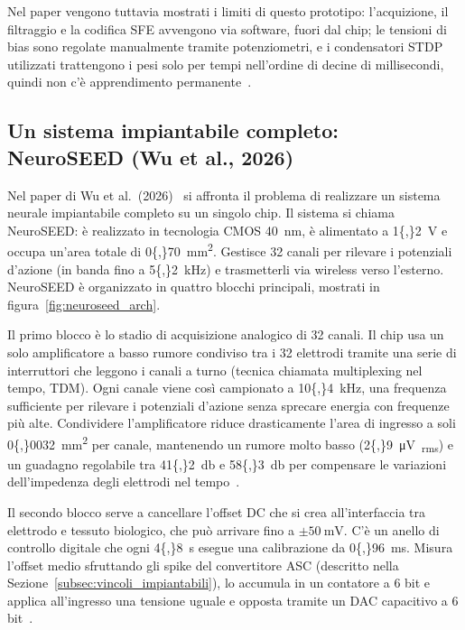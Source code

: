 Nel paper vengono tuttavia mostrati i limiti di questo prototipo: l'acquizione, il filtraggio e la codifica SFE avvengono via software, fuori dal chip; le tensioni di bias sono regolate manualmente tramite potenziometri, e i condensatori STDP utilizzati trattengono i pesi solo per tempi nell'ordine di decine di millisecondi, quindi non c'è apprendimento permanente~\cite{ronchini2023}.

\subsection{Un sistema impiantabile completo: NeuroSEED (Wu et al., 2026)}
\label{subsec:neuroseed_app}

Nel paper di Wu et al.\ (2026)~\cite{wu2026} si affronta il problema di realizzare un sistema neurale impiantabile completo su un singolo chip. Il sistema si chiama NeuroSEED: è realizzato in tecnologia CMOS \SI{40}{\nano\meter}, è alimentato a \SI{1{,}2}{\volt} e occupa un'area totale di \SI{0{,}70}{\milli\meter\squared}. Gestisce 32 canali per rilevare i potenziali d'azione (in banda fino a \SI{5{,}2}{\kilo\hertz}) e trasmetterli via wireless verso l'esterno. NeuroSEED è organizzato in quattro blocchi principali, mostrati in figura~\ref{fig:neuroseed_arch}.

Il primo blocco è lo stadio di acquisizione analogico di 32 canali. Il chip usa un solo amplificatore a basso rumore condiviso tra i 32 elettrodi tramite una serie di interruttori che leggono i canali a turno (tecnica chiamata multiplexing nel tempo, TDM). Ogni canale viene così campionato a \SI{10{,}4}{\kilo\hertz}, una frequenza sufficiente per rilevare i potenziali d'azione senza sprecare energia con frequenze più alte. Condividere l'amplificatore riduce drasticamente l'area di ingresso a soli \SI{0{,}0032}{\milli\meter\squared} per canale, mantenendo un rumore molto basso (\SI{2{,}9}{\micro\volt\textsubscript{rms}}) e un guadagno regolabile tra \SI{41{,}2}{\decibel} e \SI{58{,}3}{\decibel} per compensare le variazioni dell'impedenza degli elettrodi nel tempo~\cite{wu2026}.

Il secondo blocco serve a cancellare l'offset DC che si crea all'interfaccia tra elettrodo e tessuto biologico, che può arrivare fino a $\pm\SI{50}{\milli\volt}$. C'è un anello di controllo digitale che ogni \SI{4{,}8}{\second} esegue una calibrazione da \SI{0{,}96}{\milli\second}. Misura l'offset medio sfruttando gli spike del convertitore ASC (descritto nella Sezione~\ref{subsec:vincoli_impiantabili}), lo accumula in un contatore a 6 bit e applica all'ingresso una tensione uguale e opposta tramite un DAC capacitivo a 6 bit~\cite{wu2026}.

